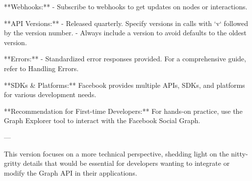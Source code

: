 **Webhooks:**
- Subscribe to webhooks to get updates on nodes or interactions.

**API Versions:**
- Released quarterly. Specify versions in calls with `v` followed by the version number.
- Always include a version to avoid defaults to the oldest version.

**Errors:**
- Standardized error responses provided. For a comprehensive guide, refer to Handling Errors.

**SDKs & Platforms:**
Facebook provides multiple APIs, SDKs, and platforms for various development needs.

**Recommendation for First-time Developers:**
For hands-on practice, use the Graph Explorer tool to interact with the Facebook Social Graph.

---

This version focuses on a more technical perspective, shedding light on the nitty-gritty details that would be essential for developers wanting to integrate or modify the Graph API in their applications.